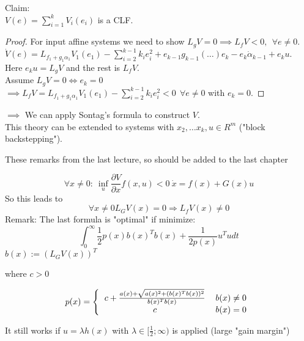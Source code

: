 Claim:\\
$V(e) = \sum \limits_{i=1}^k V_i(e_i)$ is a CLF.
\begin{proof}
    For input affine systems we need to show $L_gV = 0 \implies L_fV < 0, \ \ \forall e \neq 0$.\\
    $\dot V(e) = L_{f_1+g_1\alpha_1}V_1(e_1) - \sum \limits_{i=2}^{k-1}k_ie_i^2 + e_{k-1}g_{k-1}(\dots)e_k - e_k \dot \alpha_{k-1} + e_ku.$\\
    Here $e_ku = L_gV$ and the rest is $L_fV$.\\
    Assume $L_gV = 0 \iff e_k = 0$\\
    $\implies L_fV = L_{f_1+g_1\alpha_1}V_1(e_1) - \sum \limits_{i=2}^{k-1}k_ie_i^2 < 0 \ \ \forall e \neq 0$ with $e_k = 0$.
\end{proof}

$\implies$ We can apply Sontag's formula to construct $V$.\\

This theory can be extended to systems with $x_2, \dots x_k,u \in R^m$ ("block backstepping").

These remarks from the last lecture, so should be added to the last chapter

\begin{equation*}
\forall x \neq 0: \ \inf_{u} \frac{\partial V}{\partial x} f(x,u) < 0 \ \dot{x} = f(x) + G(x)u
\end{equation*}
So this leads to
\begin{equation*}
\forall x \neq 0 L_G V(x) = 0 \Rightarrow L_fV(x) \neq 0
\end{equation*}
Remark: The last formula is "optimal" if minimize:
\begin{equation*}
\int_{0}^{\infty}\frac{1}{2}p(x)b(x)^Tb(x) + \frac{1}{2p(x)}u^Tudt
\end{equation*}
$b(x) := (L_GV(x))^T$

where $c > 0$

\begin{equation*}
p(x) = \left \{ 
\begin{tabular}{cc} 
$c + \frac{a(x) + \sqrt{a(x)^2 + (b(x)^Tb(x))^2}}{b(x)^Tb(x)}$ & $b(x) \neq 0$ \\ 
$c$ & $b(x) = 0$ 
\end{tabular} 
\right.
\end{equation*}

It still works if $u = \lambda h(x)$ with $\lambda \in [\frac{1}{2}; \infty)$ is applied (large "gain margin")